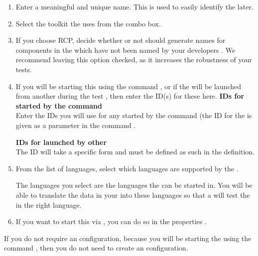 \begin{enumerate}
\item Enter a meaningful and unique \gdaut{} name. This is used to easily identify the \gdaut{} later. 
\item Select the toolkit the \gdaut{} uses from the combo box. 
\item If you choose RCP, decide whether or not \app{} should generate names for components in the \gdaut{} which have not been named by your developers . We recommend leaving this option checked, as it increases the robustness of your tests. 
\item If you will be starting this \gdaut{} using the  command , or if the \gdaut{} will be launched from another \gdaut{} during the test , then enter the ID(s) for these \gdauts{} here. 
\textbf{IDs for \gdauts{} started by the  command}\\
Enter the \gdaut{} IDs you will use for any \gdauts{} started by the  command (the \gdaut{} ID for the \gdaut{} is given as a parameter in the  command .

\textbf{IDs for \gdauts{} launched by other \gdauts{}}\\
The \gdaut{} ID will take a specific form  and must be defined as such in the \gdaut{} definition.
 
\item From the list of \gdproject{} languages, select which languages are supported by the \gdaut{}. 

The languages you select are the languages the \gdaut{} can be started in.  You will be able to translate the data in your \gdcases{} into these languages so that a \gdsuite{} will test the \gdaut{} in the right language. 


\item If you want to start this \gdaut{} via \app{}, you can do so in the \gdproject{} properties .
\end{enumerate}

If you do not require an \gdaut{} configuration, because you will be starting the \gdaut{} using the  command , then you do not need to create an \gdaut{} configuration. 

\clearpage

